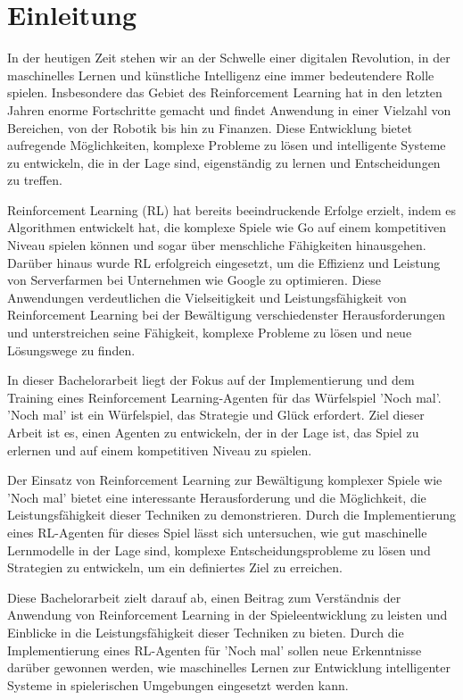 
\chapter{Einleitung}

In der heutigen Zeit stehen wir an der Schwelle einer digitalen Revolution, in der maschinelles Lernen und künstliche Intelligenz eine immer bedeutendere Rolle spielen. Insbesondere das Gebiet des Reinforcement Learning hat in den letzten Jahren enorme Fortschritte gemacht und findet Anwendung in einer Vielzahl von Bereichen, von der Robotik bis hin zu Finanzen. Diese Entwicklung bietet aufregende Möglichkeiten, komplexe Probleme zu lösen und intelligente Systeme zu entwickeln, die in der Lage sind, eigenständig zu lernen und Entscheidungen zu treffen.

Reinforcement Learning (RL) hat bereits beeindruckende Erfolge erzielt, indem es Algorithmen entwickelt hat, die komplexe Spiele wie Go auf einem kompetitiven Niveau spielen können und sogar über menschliche Fähigkeiten hinausgehen. Darüber hinaus wurde RL erfolgreich eingesetzt, um die Effizienz und Leistung von Serverfarmen bei Unternehmen wie Google zu optimieren. Diese Anwendungen verdeutlichen die Vielseitigkeit und Leistungsfähigkeit von Reinforcement Learning bei der Bewältigung verschiedenster Herausforderungen und unterstreichen seine Fähigkeit, komplexe Probleme zu lösen und neue Lösungswege zu finden.

In dieser Bachelorarbeit liegt der Fokus auf der Implementierung und dem Training eines Reinforcement Learning-Agenten für das Würfelspiel 'Noch mal'. 'Noch mal' ist ein Würfelspiel, das Strategie und Glück erfordert. Ziel dieser Arbeit ist es, einen Agenten zu entwickeln, der in der Lage ist, das Spiel zu erlernen und auf einem kompetitiven Niveau zu spielen.

\newpage
Der Einsatz von Reinforcement Learning zur Bewältigung komplexer Spiele wie 'Noch mal' bietet eine interessante Herausforderung und die Möglichkeit, die Leistungsfähigkeit dieser Techniken zu demonstrieren. Durch die Implementierung eines RL-Agenten für dieses Spiel lässt sich untersuchen, wie gut maschinelle Lernmodelle in der Lage sind, komplexe Entscheidungsprobleme zu lösen und Strategien zu entwickeln, um ein definiertes Ziel zu erreichen.


Diese Bachelorarbeit zielt darauf ab, einen Beitrag zum Verständnis der Anwendung von Reinforcement Learning in der Spieleentwicklung zu leisten und Einblicke in die Leistungsfähigkeit dieser Techniken zu bieten. Durch die Implementierung eines RL-Agenten für 'Noch mal' sollen neue Erkenntnisse darüber gewonnen werden, wie maschinelles Lernen zur Entwicklung intelligenter Systeme in spielerischen Umgebungen eingesetzt werden kann.